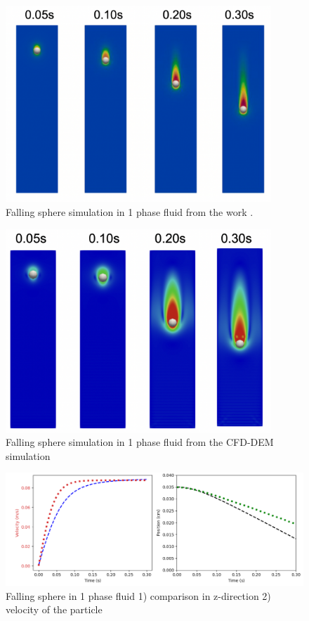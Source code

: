 \begin{figure}[!ht]
    \centering
    \includegraphics[width=10cm]{Images/chap4/1ph_exp.png}
    \caption{Falling sphere simulation in 1 phase fluid from the work \cite{nan2023high}.}
    \label{fig:1ph_exp}
\end{figure}

\begin{figure}[!ht]
    \centering
    \includegraphics[width=10cm]{Images/chap4/1ph_exp_me.png}
    \caption{Falling sphere simulation in 1 phase fluid from the CFD-DEM simulation}
    \label{fig:1ph_exp_me}
\end{figure}

\begin{figure}[!ht]
    \centering
    \includegraphics[width=16cm]{GWU_Thesis_Sarmakeeva/Images/chap4/falling_sphere_analytical.png}
    \caption{Falling sphere in 1 phase fluid 1) comparison in z-direction 2) velocity of the particle}
    \label{fig:trajectory_1ph}
\end{figure}
\newpage


